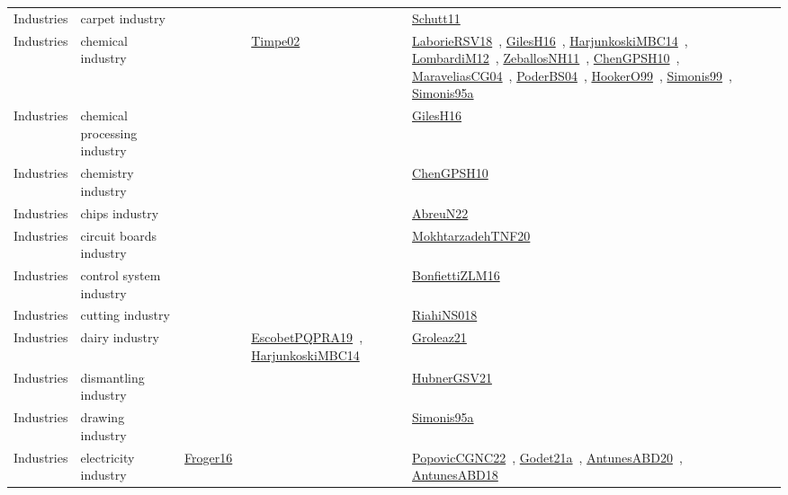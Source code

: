 {\begin{longtable}{lp{3cm}>{\raggedright\arraybackslash}p{6cm}>{\raggedright\arraybackslash}p{6cm}>{\raggedright\arraybackslash}p{8cm}}
Industries & carpet industry &  &  & \href{../works/Schutt11.pdf}{Schutt11}~\cite{Schutt11}\\
Industries & chemical industry &  & \href{../works/Timpe02.pdf}{Timpe02}~\cite{Timpe02} & \href{../works/LaborieRSV18.pdf}{LaborieRSV18}~\cite{LaborieRSV18}, \href{../works/GilesH16.pdf}{GilesH16}~\cite{GilesH16}, \href{../works/HarjunkoskiMBC14.pdf}{HarjunkoskiMBC14}~\cite{HarjunkoskiMBC14}, \href{../works/LombardiM12.pdf}{LombardiM12}~\cite{LombardiM12}, \href{../works/ZeballosNH11.pdf}{ZeballosNH11}~\cite{ZeballosNH11}, \href{../works/ChenGPSH10.pdf}{ChenGPSH10}~\cite{ChenGPSH10}, \href{../works/MaraveliasCG04.pdf}{MaraveliasCG04}~\cite{MaraveliasCG04}, \href{../works/PoderBS04.pdf}{PoderBS04}~\cite{PoderBS04}, \href{../works/HookerO99.pdf}{HookerO99}~\cite{HookerO99}, \href{../works/Simonis99.pdf}{Simonis99}~\cite{Simonis99}, \href{../works/Simonis95a.pdf}{Simonis95a}~\cite{Simonis95a}\\
Industries & chemical processing industry &  &  & \href{../works/GilesH16.pdf}{GilesH16}~\cite{GilesH16}\\
Industries & chemistry industry &  &  & \href{../works/ChenGPSH10.pdf}{ChenGPSH10}~\cite{ChenGPSH10}\\
Industries & chips industry &  &  & \href{../works/AbreuN22.pdf}{AbreuN22}~\cite{AbreuN22}\\
Industries & circuit boards industry &  &  & \href{../works/MokhtarzadehTNF20.pdf}{MokhtarzadehTNF20}~\cite{MokhtarzadehTNF20}\\
Industries & control system industry &  &  & \href{../works/BonfiettiZLM16.pdf}{BonfiettiZLM16}~\cite{BonfiettiZLM16}\\
Industries & cutting industry &  &  & \href{../works/RiahiNS018.pdf}{RiahiNS018}~\cite{RiahiNS018}\\
Industries & dairy industry &  & \href{../works/EscobetPQPRA19.pdf}{EscobetPQPRA19}~\cite{EscobetPQPRA19}, \href{../works/HarjunkoskiMBC14.pdf}{HarjunkoskiMBC14}~\cite{HarjunkoskiMBC14} & \href{../works/Groleaz21.pdf}{Groleaz21}~\cite{Groleaz21}\\
Industries & dismantling industry &  &  & \href{../works/HubnerGSV21.pdf}{HubnerGSV21}~\cite{HubnerGSV21}\\
Industries & drawing industry &  &  & \href{../works/Simonis95a.pdf}{Simonis95a}~\cite{Simonis95a}\\
Industries & electricity industry & \href{../works/Froger16.pdf}{Froger16}~\cite{Froger16} &  & \href{../works/PopovicCGNC22.pdf}{PopovicCGNC22}~\cite{PopovicCGNC22}, \href{../works/Godet21a.pdf}{Godet21a}~\cite{Godet21a}, \href{../works/AntunesABD20.pdf}{AntunesABD20}~\cite{AntunesABD20}, \href{../works/AntunesABD18.pdf}{AntunesABD18}~\cite{AntunesABD18}\\

\end{longtable}}
